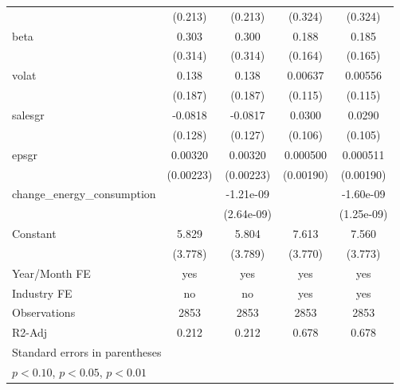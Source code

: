 \begin{table}[htbp]
\begin{tabular}{l*{4}{c}}
                    &     (0.213)         &     (0.213)         &     (0.324)         &     (0.324)         \\
[1em]
beta                &       0.303         &       0.300         &       0.188         &       0.185         \\
                    &     (0.314)         &     (0.314)         &     (0.164)         &     (0.165)         \\
[1em]
volat               &       0.138         &       0.138         &     0.00637         &     0.00556         \\
                    &     (0.187)         &     (0.187)         &     (0.115)         &     (0.115)         \\
[1em]
salesgr             &     -0.0818         &     -0.0817         &      0.0300         &      0.0290         \\
                    &     (0.128)         &     (0.127)         &     (0.106)         &     (0.105)         \\
[1em]
epsgr               &     0.00320         &     0.00320         &    0.000500         &    0.000511         \\
                    &   (0.00223)         &   (0.00223)         &   (0.00190)         &   (0.00190)         \\
[1em]
change\_energy\_consumption&                     &   -1.21e-09         &                     &   -1.60e-09         \\
                    &                     &  (2.64e-09)         &                     &  (1.25e-09)         \\
[1em]
Constant            &       5.829         &       5.804         &       7.613\sym{**} &       7.560\sym{**} \\
                    &     (3.778)         &     (3.789)         &     (3.770)         &     (3.773)         \\
\hline
Year/Month FE       &         yes         &         yes         &         yes         &         yes         \\
Industry FE         &          no         &          no         &         yes         &         yes         \\
Observations        &        2853         &        2853         &        2853         &        2853         \\
R2-Adj              &       0.212         &       0.212         &       0.678         &       0.678         \\
\hline\hline
\multicolumn{5}{l}{\footnotesize Standard errors in parentheses}\\
\multicolumn{5}{l}{\footnotesize \sym{*} \(p<0.10\), \sym{**} \(p<0.05\), \sym{***} \(p<0.01\)}\\
\end{tabular}
\end{table}
